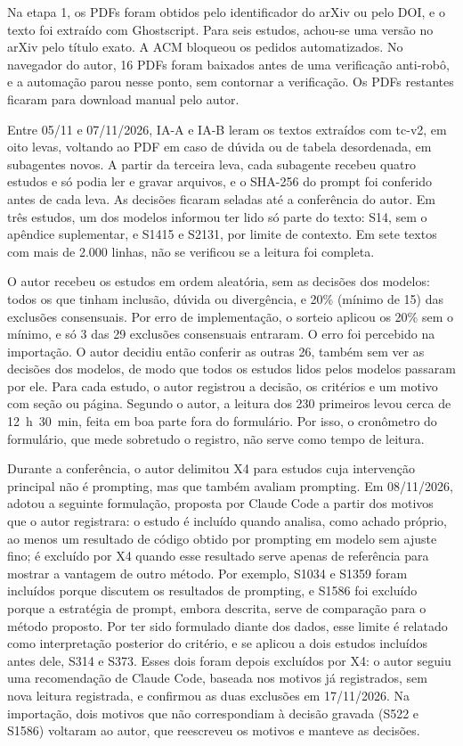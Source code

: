 Na etapa 1, os PDFs foram obtidos pelo identificador do arXiv ou pelo DOI, e o texto foi extraído com Ghostscript.
Para seis estudos, achou-se uma versão no arXiv pelo título exato. A ACM bloqueou os pedidos automatizados. No
navegador do autor, 16 PDFs foram baixados antes de uma verificação anti-robô, e a automação parou nesse ponto,
sem contornar a verificação. Os PDFs restantes ficaram para download manual pelo autor.

Entre 05/11 e 07/11/2026, IA-A e IA-B leram os textos extraídos com tc-v2, em oito levas, voltando ao PDF em caso
de dúvida ou de tabela desordenada, em subagentes novos. A partir da terceira leva, cada subagente recebeu quatro
estudos e só podia ler e gravar arquivos, e o SHA-256 do prompt foi conferido antes de cada leva. As decisões ficaram seladas até a
conferência do autor. Em três estudos, um dos modelos informou ter lido só parte do texto: S14, sem o apêndice
suplementar, e S1415 e S2131, por limite de contexto. Em sete textos com mais de 2.000 linhas, não se verificou
se a leitura foi completa.

O autor recebeu os estudos em ordem aleatória, sem as decisões dos modelos: todos os que tinham inclusão,
dúvida ou divergência, e 20\% (mínimo de 15) das exclusões consensuais. Por erro de implementação, o sorteio
aplicou os 20\% sem o mínimo, e só 3 das 29 exclusões consensuais entraram. O erro foi percebido na importação.
O autor decidiu então conferir as outras 26, também sem ver as decisões dos modelos, de modo que todos os estudos
lidos pelos modelos passaram por ele. Para cada estudo, o autor registrou a decisão, os critérios e um motivo com
seção ou página. Segundo o autor, a leitura dos 230 primeiros levou cerca de 12~h~30~min, feita em boa parte fora
do formulário. Por isso, o cronômetro do formulário, que mede sobretudo o registro, não serve como tempo de leitura.

Durante a conferência, o autor delimitou X4 para estudos cuja intervenção principal não é prompting, mas que
também avaliam prompting. Em 08/11/2026, adotou a seguinte formulação, proposta por Claude Code a partir dos
motivos que o autor registrara: o estudo é incluído quando analisa, como achado próprio, ao menos um resultado
de código obtido por prompting em modelo sem ajuste fino; é excluído por X4 quando esse resultado serve apenas de
referência para mostrar a vantagem de outro método. Por exemplo, S1034 e S1359 foram incluídos porque discutem
os resultados de prompting, e S1586 foi excluído porque a estratégia de prompt, embora descrita, serve de
comparação para o método proposto. Por ter sido formulado diante dos dados, esse limite é relatado como
interpretação posterior do critério, e se aplicou a dois estudos incluídos antes dele, S314 e S373. Esses dois
foram depois excluídos por X4: o autor seguiu uma recomendação de Claude Code, baseada nos motivos já
registrados, sem nova leitura registrada, e confirmou as duas exclusões em 17/11/2026. Na
importação, dois motivos que não correspondiam à decisão gravada (S522 e S1586) voltaram ao autor, que
reescreveu os motivos e manteve as decisões.

